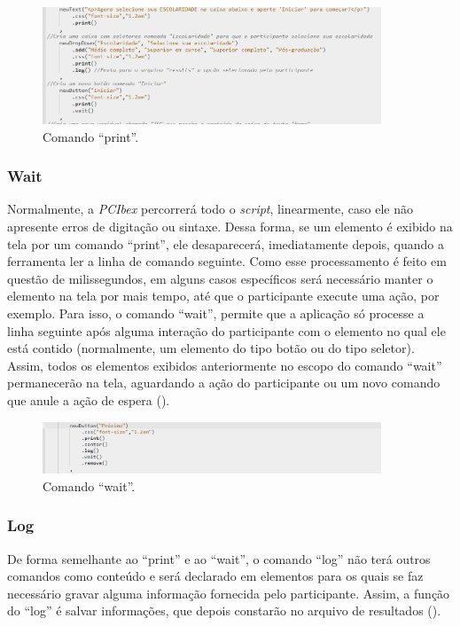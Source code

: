 \documentclass{textolivre}
\begin{document}
\begin{figure}[htbp]
 \centering
 \includegraphics[width=0.9\textwidth]{fig-015.png}
 \caption{Comando “print”.}
 \label{fig15}
\end{figure}

\subsubsection{Wait}
Normalmente, a \emph{PCIbex} percorrerá todo o \emph{script}, linearmente, caso ele não apresente erros de digitação ou sintaxe. Dessa forma, se um elemento é exibido na tela por um comando “print”, ele desaparecerá, imediatamente depois, quando a ferramenta ler a linha de comando seguinte. Como esse processamento é feito em questão de milissegundos, em alguns casos específicos será necessário manter o elemento na tela por mais tempo, até que o participante execute uma ação, por exemplo. Para isso, o comando “wait”, permite que a aplicação só processe a linha seguinte após alguma interação do participante com o elemento no qual ele está contido (normalmente, um elemento do tipo botão ou do tipo seletor). Assim, todos os elementos exibidos anteriormente no escopo do comando “wait” permanecerão na tela, aguardando a ação do participante ou um novo comando que anule a ação de espera ().

\begin{figure}[htbp]
 \centering
 \includegraphics[width=0.9\textwidth]{fig-016.png}
 \caption{Comando “wait”.}
 \label{fig16}
\end{figure}

\subsubsection{Log}
De forma semelhante ao “print” e ao “wait”, o comando “log” não terá outros comandos como conteúdo e será declarado em elementos para os quais se faz necessário gravar alguma informação fornecida pelo participante. Assim, a função do “log” é salvar informações, que depois constarão no arquivo de resultados ().
\end{document}
